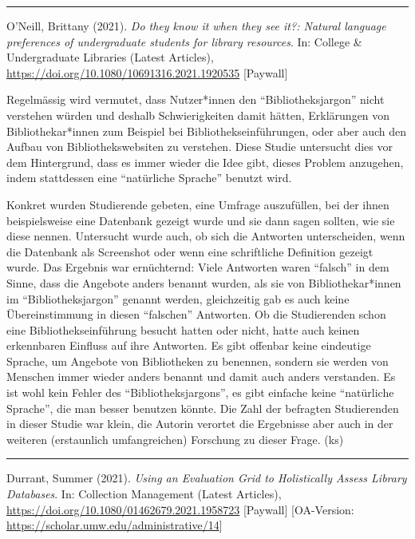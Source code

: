 \documentclass[a4paper,
fontsize=11pt,
oneside,
numbers=noperiodatend,
parskip=half-,
bibliography=totoc,
final
]{scrartcl}
\begin{document}
\begin{center}\rule{0.5\linewidth}{0.5pt}\end{center}

O'Neill, Brittany (2021). \emph{Do they know it when they see it?:
Natural language preferences of undergraduate students for library
resources}. In: College \& Undergraduate Libraries (Latest Articles),
\url{https://doi.org/10.1080/10691316.2021.1920535} {[}Paywall{]}

Regelmässig wird vermutet, dass Nutzer*innen den
\enquote{Bibliotheksjargon} nicht verstehen würden und deshalb
Schwierigkeiten damit hätten, Erklärungen von Bibliothekar*innen zum
Beispiel bei Bibliothekseinführungen, oder aber auch den Aufbau von
Bibliothekswebsiten zu verstehen. Diese Studie untersucht dies vor dem
Hintergrund, dass es immer wieder die Idee gibt, dieses Problem
anzugehen, indem stattdessen eine \enquote{natürliche Sprache} benutzt
wird.

Konkret wurden Studierende gebeten, eine Umfrage auszufüllen, bei der
ihnen beispielsweise eine Datenbank gezeigt wurde und sie dann sagen
sollten, wie sie diese nennen. Untersucht wurde auch, ob sich die
Antworten unterscheiden, wenn die Datenbank als Screenshot oder wenn
eine schriftliche Definition gezeigt wurde. Das Ergebnis war
ernüchternd: Viele Antworten waren \enquote{falsch} in dem Sinne, dass
die Angebote anders benannt wurden, als sie von Bibliothekar*innen im
\enquote{Bibliotheksjargon} genannt werden, gleichzeitig gab es auch
keine Übereinstimmung in diesen \enquote{falschen} Antworten. Ob die
Studierenden schon eine Bibliothekseinführung besucht hatten oder nicht,
hatte auch keinen erkennbaren Einfluss auf ihre Antworten. Es gibt
offenbar keine eindeutige Sprache, um Angebote von Bibliotheken zu
benennen, sondern sie werden von Menschen immer wieder anders benannt
und damit auch anders verstanden. Es ist wohl kein Fehler des
\enquote{Bibliotheksjargons}, es gibt einfache keine \enquote{natürliche
Sprache}, die man besser benutzen könnte. Die Zahl der befragten
Studierenden in dieser Studie war klein, die Autorin verortet die
Ergebnisse aber auch in der weiteren (erstaunlich umfangreichen)
Forschung zu dieser Frage. (ks)

\begin{center}\rule{0.5\linewidth}{0.5pt}\end{center}

Durrant, Summer (2021). \emph{Using an Evaluation Grid to Holistically
Assess Library Databases}. In: Collection Management (Latest Articles),
\url{https://doi.org/10.1080/01462679.2021.1958723} {[}Paywall{]}
{[}OA-Version: \url{https://scholar.umw.edu/administrative/14}{]}
\end{document}
